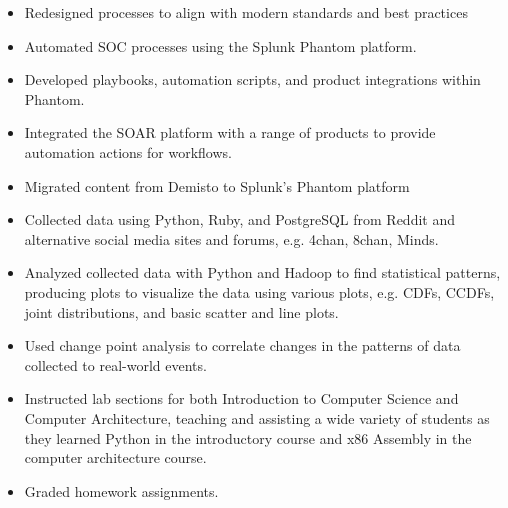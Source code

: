 \documentclass[10pt]{setzerresume}
\begin{document}
  \begin{itemize}[nosep]
    \item Redesigned processes to align with modern standards and best practices
    \item Automated SOC processes using the Splunk Phantom platform.
    \item Developed playbooks, automation scripts, and product integrations within Phantom.
    \item Integrated the SOAR platform with a range of products to provide automation actions for workflows.
    \item Migrated content from Demisto to Splunk's Phantom platform
  \end{itemize}



  \begin{itemize}[nosep]%
    \item Collected data using Python, Ruby, and PostgreSQL from Reddit and alternative social media sites and forums, e.g. 4chan, 8chan, Minds.
    \item Analyzed collected data with Python and Hadoop to find statistical patterns, producing plots to visualize the data using various plots, e.g. CDFs, CCDFs, joint distributions, and basic scatter and line plots.
    \item Used change point analysis to correlate changes in the patterns of data collected to real-world events.
    \item Instructed lab sections for both Introduction to Computer Science and Computer Architecture, teaching and assisting a wide variety of students as they learned Python in the introductory course and x86 Assembly in the computer architecture course.
    \item Graded homework assignments.
  \end{itemize}


\end{document}
